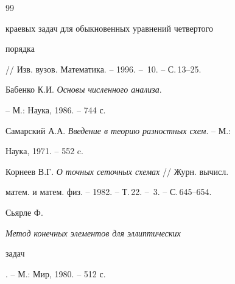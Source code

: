 \begin{thebibliography}{99}
{краевых задач для обыкновенных уравнений четвертого


порядка} // Изв. вузов. Математика. -- 1996. -- \No\,10. -- С.\,13--25.




Бабенко К.И. {\em Основы численного анализа}.


-- М.: Наука, 1986. -- 744 с.




Самарский А.А. {\em Введение в теорию разностных схем}. -- М.:


Наука, 1971. -- 552 c.




Корнеев В.Г. {\em О точных сеточных схемах} // Журн. вычисл.


матем. и матем. физ. -- 1982. -- Т.\,22. -- \No\,3. -- С.\,645--654.




Сьярле Ф. {\em Метод конечных элементов для эллиптических


задач}. -- М.: Мир, 1980. -- 512 с.





\end{thebibliography}





\vskip 2cm









\smallskip









\label{end}





